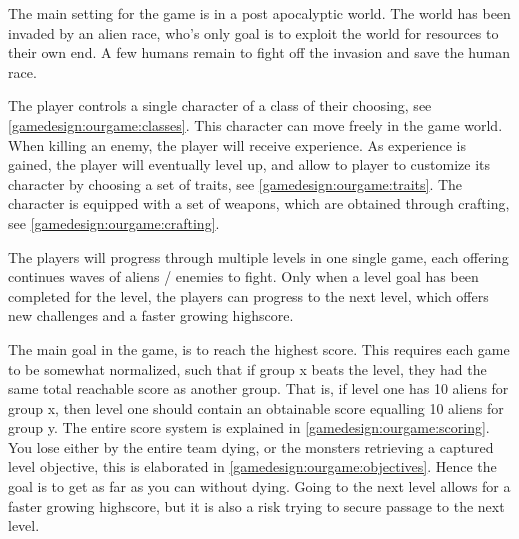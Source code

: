 
The main setting for the game is in a post apocalyptic world.
The world has been invaded by an alien race, who's only goal is to exploit the world for resources to their own end. 
A few humans remain to fight off the invasion and save the human race. 

The player controls a single character of a class of their choosing, see \ref{gamedesign:ourgame:classes}. 
This character can move freely in the game world.
When killing an enemy, the player will receive experience.
As experience is gained, the player will eventually level up, and allow to player to customize its character by choosing a set of traits, see \ref{gamedesign:ourgame:traits}.
The character is equipped with a set of weapons, which are obtained through crafting, see \ref{gamedesign:ourgame:crafting}.

The players will progress through multiple levels in one single game, each offering continues waves of aliens / enemies to fight. Only when a level goal has been completed for the level, the players can progress to the next level, which offers new challenges and a faster growing highscore. 

The main goal in the game, is to reach the highest score. This requires each game to be somewhat normalized, such that if group x beats the level, they had the same total reachable score as another group. That is, if level one has 10 aliens for group x, then level one should contain an obtainable score equalling 10 aliens for group y. The entire score system is explained in \ref{gamedesign:ourgame:scoring}. You lose either by the entire team dying, or the monsters retrieving a captured level objective, this is elaborated in \ref{gamedesign:ourgame:objectives}. Hence the goal is to get as far as you can without dying. Going to the next level allows for a faster growing highscore, but it is also a risk trying to secure passage to the next level.




